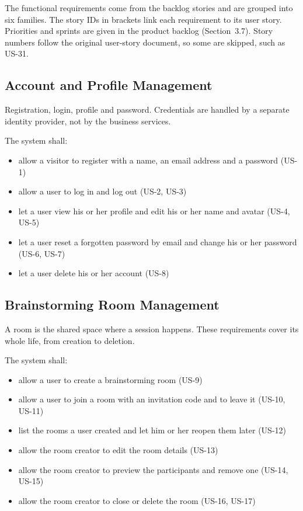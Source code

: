 \documentclass[12pt,a4paper]{report}
\begin{document}
The functional requirements come from the backlog stories and are grouped into six families. The story IDs in brackets link each requirement to its user story. Priorities and sprints are given in the product backlog (Section~3.7). Story numbers follow the original user-story document, so some are skipped, such as US-31.

\subsection{Account and Profile Management}
\label{subsec:fr-account}

Registration, login, profile and password. Credentials are handled by a separate identity provider, not by the business services.

\noindent The system shall:
\begin{itemize}
  \item allow a visitor to register with a name, an email address and a password (US-1)
  \item allow a user to log in and log out (US-2, US-3)
  \item let a user view his or her profile and edit his or her name and avatar (US-4, US-5)
  \item let a user reset a forgotten password by email and change his or her password (US-6, US-7)
  \item let a user delete his or her account (US-8)
\end{itemize}

\subsection{Brainstorming Room Management}
\label{subsec:fr-rooms}

A room is the shared space where a session happens. These requirements cover its whole life, from creation to deletion.

\noindent The system shall:
\begin{itemize}
  \item allow a user to create a brainstorming room (US-9)
  \item allow a user to join a room with an invitation code and to leave it (US-10, US-11)
  \item list the rooms a user created and let him or her reopen them later (US-12)
  \item allow the room creator to edit the room details (US-13)
  \item allow the room creator to preview the participants and remove one (US-14, US-15)
  \item allow the room creator to close or delete the room (US-16, US-17)
\end{itemize}
\end{document}
